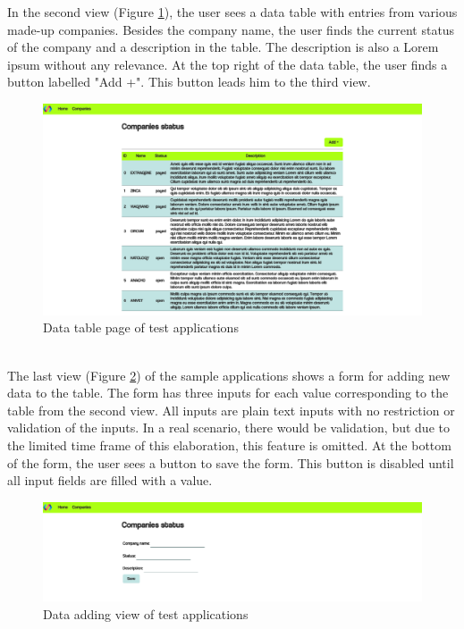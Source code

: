 In the second view (Figure \ref{data_table}), the user sees a data table with entries from various made-up companies. Besides the company name, the user finds the current status of the company and a description in the table. The description is also a Lorem ipsum without any relevance. At the top right of the data table, the user finds a button labelled "Add +". This button leads him to the third view. 
\begin{figure}[htbp]
    \centerline{\includegraphics[width=\linewidth, draft=false]{images/demo_view_data_table.png}}
    \caption{Data table page of test applications}
    \label{data_table}
    \end{figure}
    \\

The last view (Figure \ref{adding_form}) of the sample applications shows a form for adding new data to the table. The form has three inputs for each value corresponding to the table from the second view. All inputs are plain text inputs with no restriction or validation of the inputs. In a real scenario, there would be validation, but due to the limited time frame of this elaboration, this feature is omitted. At the bottom of the form, the user sees a button to save the form. This button is disabled until all input fields are filled with a value. 
\begin{figure}[htbp]
    \centerline{\includegraphics[width=\linewidth, draft=false]{images/demo_view_form.png}}
    \caption{Data adding view of test applications}
    \label{adding_form}
    \end{figure}
\\

